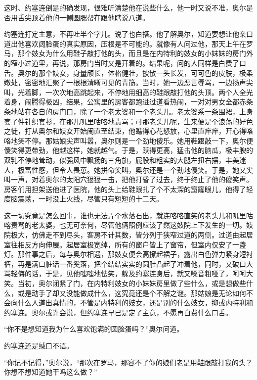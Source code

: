     这时、约塞连倒是的确发现，很难听清楚他在说些什么，他一时又说不准，奥尔是否用舌尖顶着他的一侧圆腮帮在跟他瞎说八道。

 


    约塞连打定主意，不再吐半个字儿。说了也白搭。他了解奥尔，知道要想让他亲口道出他喜欢阔脸蛋的真实原因，压根是不可能的。就像有人问过他，那天上午在罗马，那个妓女为什么用鞋子敲打他的头，而且是在内特利的妓女的小妹妹的房门外的窄小过道里，再说，那房门当时又是开着的。结果呢，问的人同样是白费了口舌。奥尔的那个妓女，身量颀长，体格健壮，披散一头长发，可可色的皮肤，极柔嫩处，密密地汇聚了一根根清晰可见的青筋。当时，她一边恶言辱骂，一边扬声尖叫，光着脚，一次次地高跳起来，不停地用细高的鞋跟敲打他的头顶。两个人全光着身，闹腾得极凶，结果，公寓里的房客都跑进过道看热闹，一对对男女全都赤条条地站在各自的房门口，除了一个老太婆和一个老头儿。老太婆系一条围裙，上身套了件针织套衫，在那儿叽里咕咯地责骂；可那老头儿呢，生来便是个浪荡的好色之徒，打从奥尔和妓女开始闹直至结束，他瞧得心花怒放，心里直痒痒，开心得咯咯地笑不停。那姑娘尖声叫嚣，奥尔则是一个劲地傻乐。她用鞋跟敲一下，奥尔便傻笑得更带劲，他越这样，她就越气。于是，跃得更高，猛击他的脑瓜，极丰腴的双乳不停地耸动，似强风中飘扬的三角旗，屁股和粗实的大腿左扭右摆，丰美迷人，极富性感，但令人畏葸。她拼命尖叫，奥尔还是一个劲地傻笑。于是，她又尖叫一声，对着奥尔的太阳穴狠狠一击，把他打昏了过去，终于终止了他的傻笑声。房客们用担架送他进了医院，他的头上给鞋跟扎了个不太深的窟窿眼儿，他得了轻度脑震荡，一时没上火线，尽管只有短短的十二天。

    这一切究竟是怎么回事，谁也无法弄个水落石出，就连咯咯直笑的老头儿和叽里咕喀责骂的老太婆，也无可奈何，尽管他俩照例应该了然这妓院上下发生的一切。妓院极大，仿佛走不到尽头，客房不计其数，皆分列于狭窄过道的两侧。过道由起居室往相反方向伸展。起居室极宽绰，所有的窗户皆上了窗帘，但室内仅安了一盏灯。那件事之后，每与奥尔相遇，那妓女便会高撩起裙子，露出白色弹力紧身短衬裤，再是满口脏话一番奚落，把个结结实实的圆肚凸起了冲着他，同时，又破口大骂轻侮的话，于是，见他嗤嗤地怯笑，躲及约塞连身后，就又嗓音粗哑了，呵呵大笑。当初，奥尔闭紧了门，在内特利妓女的小妹妹房里做了些什么，或是想做些什么，或是动手了却又没能做成什么，这究竟还是个不解之谜。那姑娘是无论如何不会向什么人道出真情的，不管是内特利的妓女，还是别的什么妓女，抑或内特利和约塞连。奥尔或许会说，但约塞连早已是定了主意，不愿再白费什么口舌。

    “你不是想知道我为什么喜欢饱满的圆脸蛋吗？”奥尔问道。

    约塞连还是缄口不语。

    “你记不记得，”奥尔说，“那次在罗马，那容不了你的娘们老是用鞋跟敲打我的头？你想不想知道她干吗这么做？”

